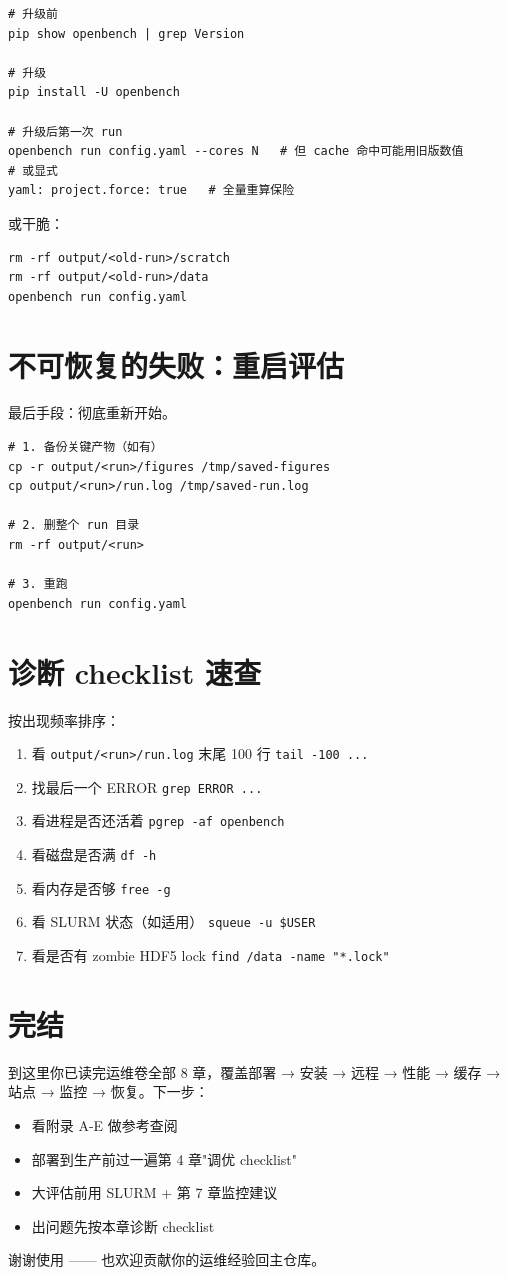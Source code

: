 \begin{verbatim}
# 升级前
pip show openbench | grep Version

# 升级
pip install -U openbench

# 升级后第一次 run
openbench run config.yaml --cores N   # 但 cache 命中可能用旧版数值
# 或显式
yaml: project.force: true   # 全量重算保险
\end{verbatim}

或干脆：

\begin{verbatim}
rm -rf output/<old-run>/scratch
rm -rf output/<old-run>/data
openbench run config.yaml
\end{verbatim}

\section{不可恢复的失败：重启评估}

最后手段：彻底重新开始。

\begin{verbatim}
# 1. 备份关键产物（如有）
cp -r output/<run>/figures /tmp/saved-figures
cp output/<run>/run.log /tmp/saved-run.log

# 2. 删整个 run 目录
rm -rf output/<run>

# 3. 重跑
openbench run config.yaml
\end{verbatim}

\section{诊断 checklist 速查}

按出现频率排序：

\begin{enumerate}
  \item 看 \texttt{output/<run>/run.log} 末尾 100 行 \texttt{tail -100 ...}
  \item 找最后一个 ERROR \texttt{grep ERROR ...}
  \item 看进程是否还活着 \texttt{pgrep -af openbench}
  \item 看磁盘是否满 \texttt{df -h}
  \item 看内存是否够 \texttt{free -g}
  \item 看 SLURM 状态（如适用） \texttt{squeue -u \$USER}
  \item 看是否有 zombie HDF5 lock \texttt{find /data -name "*.lock"}
\end{enumerate}

\section{完结}

到这里你已读完运维卷全部 8 章，覆盖部署 → 安装 → 远程 → 性能 → 缓存 → 站点 → 监控 → 恢复。下一步：

\begin{itemize}
  \item 看附录 A-E 做参考查阅
  \item 部署到生产前过一遍第 4 章"调优 checklist"
  \item 大评估前用 SLURM + 第 7 章监控建议
  \item 出问题先按本章诊断 checklist
\end{itemize}

谢谢使用 \openbench{} —— 也欢迎贡献你的运维经验回主仓库。

